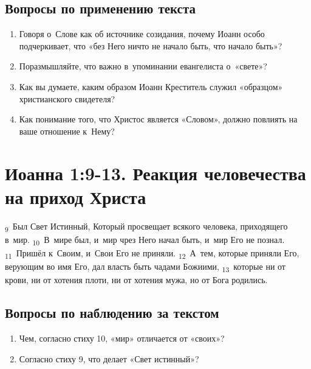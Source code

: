 \documentclass[a4paper,12pt]{article}
\begin{document}
\subsection*{Вопросы по применению текста}

\begin{enumerate}
    \item Говоря о~Слове как об источнике созидания, почему Иоанн особо подчеркивает, что «без Него ничто не начало быть, что начало быть»?
    
    \myline
    
    \myline

    \item Поразмышляйте, что важно в~упоминании евангелиста о~«свете»? 
    
    \myline
    
    \myline
    
    \item Как вы думаете, каким образом Иоанн Креститель служил «образцом» христианского свидетеля? 
    
    \myline
    
    \myline
    
    \item Как понимание того, что Христос является «Словом», должно повлиять на ваше отношение к~Нему?
    
    \myline
    
    \myline

\end{enumerate}


\section{Иоанна 1:9-13. Реакция человечества на приход Христа}

\textsubscript{9}~Был Свет Истинный, Который просвещает всякого человека, приходящего в~мир.
\textsubscript{10}~В~мире был, и~мир чрез Него начал быть, и~мир Его не познал.
\textsubscript{11}~Пришёл к~Своим, и~Свои Его не приняли.
\textsubscript{12}~А~тем, которые приняли Его, верующим во имя Его, дал власть быть чадами Божиими,
\textsubscript{13}~которые ни от крови, ни от хотения плоти, ни от хотения мужа, но от Бога родились.

\subsection*{Вопросы по наблюдению за текстом}
\begin{enumerate}
    \item Чем, согласно стиху 10, «мир» отличается от «своих»? 
    
    \myline
    
    \myline

    \item Согласно стиху 9, что делает «Свет истинный»?

    \myline
    
    \myline   
\end{enumerate}
\end{document}
